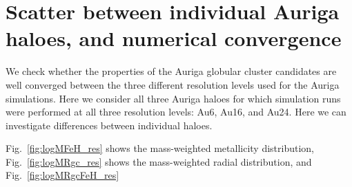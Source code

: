 \documentclass[a4paper,fleqn,usenatbib]{mnras}
\begin{document}








\clearpage
\appendix
\section{Scatter between individual Auriga haloes, and numerical convergence} 
\label{sec:scatter-convergence}
We check whether the properties of the Auriga globular cluster candidates 
are well converged between the three different resolution levels used for the 
Auriga simulations. Here we consider all three Auriga haloes for which simulation
runs were performed at all three resolution levels: Au6, Au16, and Au24. Here
we can investigate differences between individual haloes. 

Fig.~\ref{fig:logMFeH_res} shows the mass-weighted metallicity distribution, 
Fig.~\ref{fig:logMRgc_res} shows the mass-weighted radial distribution, and
Fig.~\ref{fig:logMRgcFeH_res}
\end{document}
